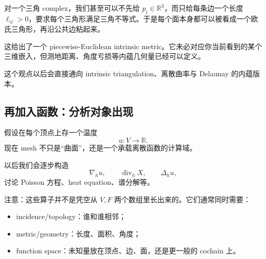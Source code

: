 \documentclass[UTF8,11pt]{ctexart}
\begin{document}
\begin{center}
\end{center}

\begin{sidenote}
对一个三角 complex，我们甚至可以不先给 $p_i\in\mathbb R^3$，而只给每条边一个长度 $\ell_{ij}>0$，要求每个三角形满足三角不等式。于是每个面本身都可以被看成一个欧氏三角形，再沿公共边粘起来。

这给出了一个 piecewise-Euclidean intrinsic metric。它未必对应你当前看到的某个三维嵌入，但测地距离、角度亏损等内蕴几何量已经可以定义。

这个观点以后会直接通向 intrinsic triangulation、离散曲率与 Delaunay 的内蕴版本。
\end{sidenote}

\subsection{再加入函数：分析对象出现}

假设在每个顶点上存一个温度
\[
u:V\to\mathbb R.
\]
现在 mesh 不只是“曲面”，还是一个承载离散函数的计算域。

以后我们会逐步构造
\[
\nabla_h u,\qquad \operatorname{div}_h X,\qquad \Delta_h u,
\]
讨论 Poisson 方程、heat equation、谱分解等。

注意：这些算子并不是凭空从 $V,F$ 两个数组里长出来的。它们通常同时需要：

\begin{itemize}
  \item incidence/topology：谁和谁相邻；
  \item metric/geometry：长度、面积、角度；
  \item function space：未知量放在顶点、边、面，还是更一般的 cochain 上。
\end{itemize}
\end{document}
